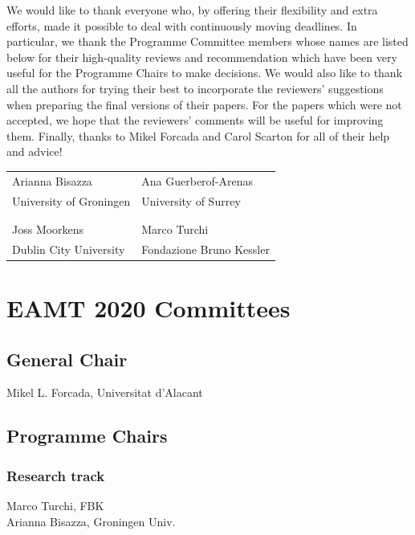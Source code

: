 \documentclass[a4paper,11pt,twoside]{book}
\begin{document}
\begin{onehalfspacing}
We would like to thank everyone who, by offering their flexibility and extra efforts, made it possible to deal with continuously moving deadlines. In particular, we thank the Programme Committee members whose names are listed below for their high-quality reviews and recommendation which have been very useful for the Programme Chairs to make decisions. We would also like to thank all the authors for trying their best to incorporate the reviewers’ suggestions when preparing the final versions of their papers. For the papers which were not accepted, we hope that the reviewers’ comments will be useful for improving them. Finally, thanks to Mikel Forcada and Carol Scarton for all of their help and advice!

\vspace{1cm}
\begin{center}
\setlength{\tabcolsep}{20pt}
\begin{tabular}{ll}
Arianna Bisazza 		& Ana Guerberof-Arenas\\
University of Groningen	& University of Surrey \\
\\
\\
Joss Moorkens			& Marco Turchi\\
Dublin City University	& Fondazione Bruno Kessler\\
\end{tabular}

\end{center}

\end{onehalfspacing}


\chapter*{EAMT 2020 Committees}

\section*{General Chair}
\noindent Mikel L. Forcada, Universitat d’Alacant


\section*{Programme Chairs}
\subsection*{Research track}
\noindent Marco Turchi, FBK\\
\noindent Arianna Bisazza, Groningen Univ.
\end{document}
